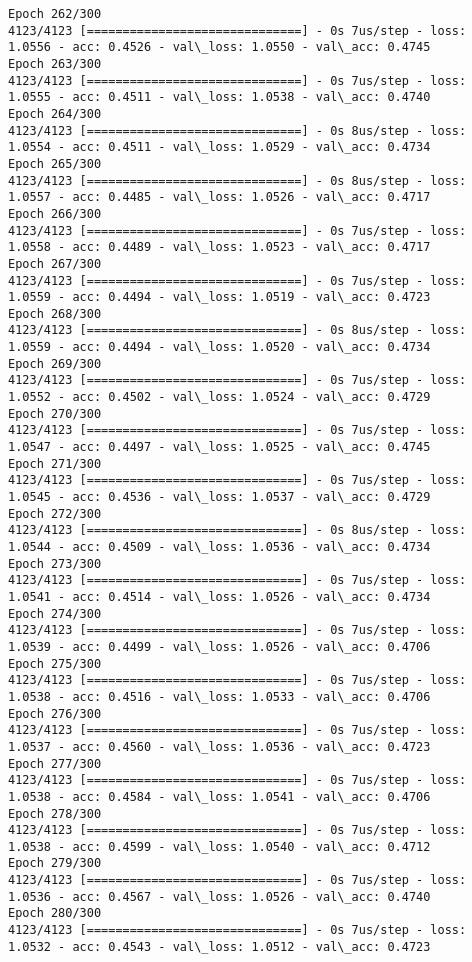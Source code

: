 \documentclass[11pt]{article}
\begin{document}
\begin{Verbatim}[commandchars=\\\{\}]
Epoch 262/300
4123/4123 [==============================] - 0s 7us/step - loss: 1.0556 - acc: 0.4526 - val\_loss: 1.0550 - val\_acc: 0.4745
Epoch 263/300
4123/4123 [==============================] - 0s 7us/step - loss: 1.0555 - acc: 0.4511 - val\_loss: 1.0538 - val\_acc: 0.4740
Epoch 264/300
4123/4123 [==============================] - 0s 8us/step - loss: 1.0554 - acc: 0.4511 - val\_loss: 1.0529 - val\_acc: 0.4734
Epoch 265/300
4123/4123 [==============================] - 0s 8us/step - loss: 1.0557 - acc: 0.4485 - val\_loss: 1.0526 - val\_acc: 0.4717
Epoch 266/300
4123/4123 [==============================] - 0s 7us/step - loss: 1.0558 - acc: 0.4489 - val\_loss: 1.0523 - val\_acc: 0.4717
Epoch 267/300
4123/4123 [==============================] - 0s 7us/step - loss: 1.0559 - acc: 0.4494 - val\_loss: 1.0519 - val\_acc: 0.4723
Epoch 268/300
4123/4123 [==============================] - 0s 8us/step - loss: 1.0559 - acc: 0.4494 - val\_loss: 1.0520 - val\_acc: 0.4734
Epoch 269/300
4123/4123 [==============================] - 0s 7us/step - loss: 1.0552 - acc: 0.4502 - val\_loss: 1.0524 - val\_acc: 0.4729
Epoch 270/300
4123/4123 [==============================] - 0s 7us/step - loss: 1.0547 - acc: 0.4497 - val\_loss: 1.0525 - val\_acc: 0.4745
Epoch 271/300
4123/4123 [==============================] - 0s 7us/step - loss: 1.0545 - acc: 0.4536 - val\_loss: 1.0537 - val\_acc: 0.4729
Epoch 272/300
4123/4123 [==============================] - 0s 8us/step - loss: 1.0544 - acc: 0.4509 - val\_loss: 1.0536 - val\_acc: 0.4734
Epoch 273/300
4123/4123 [==============================] - 0s 7us/step - loss: 1.0541 - acc: 0.4514 - val\_loss: 1.0526 - val\_acc: 0.4734
Epoch 274/300
4123/4123 [==============================] - 0s 7us/step - loss: 1.0539 - acc: 0.4499 - val\_loss: 1.0526 - val\_acc: 0.4706
Epoch 275/300
4123/4123 [==============================] - 0s 7us/step - loss: 1.0538 - acc: 0.4516 - val\_loss: 1.0533 - val\_acc: 0.4706
Epoch 276/300
4123/4123 [==============================] - 0s 7us/step - loss: 1.0537 - acc: 0.4560 - val\_loss: 1.0536 - val\_acc: 0.4723
Epoch 277/300
4123/4123 [==============================] - 0s 7us/step - loss: 1.0538 - acc: 0.4584 - val\_loss: 1.0541 - val\_acc: 0.4706
Epoch 278/300
4123/4123 [==============================] - 0s 7us/step - loss: 1.0538 - acc: 0.4599 - val\_loss: 1.0540 - val\_acc: 0.4712
Epoch 279/300
4123/4123 [==============================] - 0s 7us/step - loss: 1.0536 - acc: 0.4567 - val\_loss: 1.0526 - val\_acc: 0.4740
Epoch 280/300
4123/4123 [==============================] - 0s 7us/step - loss: 1.0532 - acc: 0.4543 - val\_loss: 1.0512 - val\_acc: 0.4723

\end{Verbatim}
\end{document}
